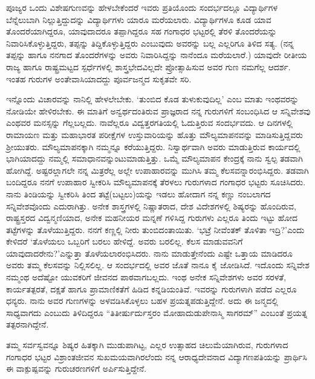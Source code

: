 {ಪೂಜ್ಯರ ಒಂದು ವಿಶೇಷಗುಣವನ್ನು ಹೇಳಬೇಕೆಂದರೆ ಇವರು ಪ್ರತಿಯೊಂದು ಸಂದರ್ಭ\-ದಲ್ಲೂ ವಿದ್ಯಾರ್ಥಿಗಳ ಬೆನ್ನೆಲುಬಾಗಿ ನಿಲ್ಲುತ್ತಿದ್ದುದನ್ನು ವಿದ್ಯಾರ್ಥಿಗಳು\-  ಯಾರೂ ಮರೆಯಲಾರು. ವಿದ್ಯಾರ್ಥಿಗಳೂ ಕೂಡ ಯಾವ ತೊಂದರೆಯಾಗಿದ್ದರೂ, ಯಾವುದಾದರೂ ತಪ್ಪಾಗಿದ್ದರೂ ಸಹ ಗಂಗಾಧರ ಭಟ್ಟರಲ್ಲಿ ತೆರಳಿ ತೊಂದರೆಯನ್ನು ನಿವಾರಿಸಿಕೊಳ್ಳುತ್ತಿದ್ದರು, ತಪ್ಪನ್ನು ತಿದ್ದಿಕೊಳ್ಳುತ್ತಿದ್ದರು ಎಂಬುವುದು ಅವರನ್ನು ಬಲ್ಲ ಎಲ್ಲರಿಗೂ ತಿಳಿದ ಸತ್ಯ. (ನನ್ನ ತಪ್ಪನ್ನು ಹಾಗೂ ನನಗಾದ ತೊಂದರೆಗಳನ್ನು ಅವರು ನಿವಾರಿಸಿದ್ದನ್ನು ನಾನೆಂದೂ ಮರೆಯ\-ಲಾರೆ.) ಯಾವುದೇ ರೀತೀಯ ರಾಜ್ಯ ಹಾಗೂ ರಾಷ್ಟ್ರಮಟ್ಟದ ಸ್ಪರ್ಧೆಗಳಲ್ಲಿ ಶಾಸ್ತ್ರಭೇದವಿಲ್ಲದೇ ಪ್ರೋತ್ಸಾಹಿಸುವ ಅವರ ಗುಣ ನಮಗೆಲ್ಲ ಆದರ್ಶ. ಇಂತಹ ಗುರುಗಳ ಅಂತೇವಾಸಿಯಾದದ್ದು ಪೂರ್ವಜನ್ಮದ ಸುಕೃತವೇ ಸರಿ.
\vskip 2pt

ಇನ್ನೊಂದು ವಿಚಾರವನ್ನು ನಾನಿಲ್ಲಿ ಹೇಳಲೇಬೇಕು. ‘ತುಂಬಿದ ಕೊಡ ತುಳುಕುವುದಿಲ್ಲ’ ಎಂಬ ಮಾತು ಇಂಥವರನ್ನು ನೋಡಿಯೇ ಹೇಳಿರಬೇಕು. ಈ ಮಾತಿಗೆ ಅನ್ವರ್ಥ\-ದಂತಿರುವ ಪ್ರಾಜ್ಞರಾದ ನನ್ನ ಗುರುಗಳಿಗೆ ಸಂಬಂಧಿಸಿದ ಆ ಸನ್ನಿವೇಶವು ಎಂಥವರ ಮನಸ್ಸನ್ನು ಗೆಲ್ಲಬಲ್ಲದು. ನಾವೆಲ್ಲರೂ ವಿದ್ವತ್ತರಗತಿಯಲ್ಲಿ ಓದುತ್ತಿರುವ ಸಂದರ್ಭವದು.  ಆ ದಿನಗಳಲ್ಲಿ  ರಾಮಾಯಣ ಮತ್ತು ಮಹಾಭಾರತ ಪರೀಕ್ಷೆಗಳ ಉಸ್ತುವಾರಿಯನ್ನು ಹೊತ್ತು ಮೌಲ್ಯಮಾಪನವನ್ನು ಮಾಡಿಸುತ್ತಿದ್ದವರು ಶ್ರೀಯುತರು. ಮೌಲ್ಯಮಾಪನಕ್ಕಾಗಿ ನಮ್ಮನ್ನೂ ಕರೆಯುತ್ತಿದ್ದರು. ನಿಸ್ವಾರ್ಥವಾಗಿ ಅವರು ಮಾಡುತ್ತಿರುವ ಕಾರ್ಯದಲ್ಲಿ ಭಾಗಿಯಾದದ್ದು ನಮ್ಮಲ್ಲಿ ಸಮಾಧಾನವನ್ನುಂಟುಮಾಡುತ್ತಿತ್ತು. ಒಮ್ಮೆ ಮೌಲ್ಯಮಾಪನ ಕೇಂದ್ರಕ್ಕೆ ನಾನು ಸ್ವಲ್ಪ ತಡವಾಗಿ ಹೋಗಿದ್ದೆ. ಅಷ್ಟರಲ್ಲಾಗಲೇ ನನ್ನ ಮಿತ್ರರೆಲ್ಲ ಅಲ್ಲೇ ಉಪಾಹಾರವನ್ನು ಮುಗಿಸಿ ತಮ್ಮ ಕೆಲಸವನ್ನಾರಂಭಿಸಿದ್ದರು. ತಡವಾಗಿ ಬಂದಿದ್ದರೂ ನನಗೆ ಉಪಾಹಾರ ಸ್ವೀಕರಿಸಿ ಮೌಲ್ಯಮಾಪನಕ್ಕೆ ತೆರಳಲು ಗುರುಗಳಾದ ಗಂಗಾಧರ ಭಟ್ಟರು ಸೂಚಿಸಿದರು. ನಾನು ತಿಂಡಿಯನ್ನು ಸ್ವೀಕರಿಸಿ ತಿಂದ ತಟ್ಟೆ(ಬಟ್ಟಲು)ಯನ್ನು ಇಡಲು ಹೋದಾಗ ನನ್ನ ಕಣ್ಣು ನಂಬಲಾಗದ ಸನ್ನಿವೇಶವೊಂದು ಎದುರಾಗಿತ್ತು. ಅನೇಕ ಶಾಸ್ತ್ರಗಳಲ್ಲಿ ನಿಷ್ಣಾತರಾದ, ದೇಶ ವಿದೇಶಗಳಲ್ಲಿ ಶಿಷ್ಯರನ್ನು ಹೊಂದಿರುವ, ರಾಷ್ಟ್ರಸ್ತರದ ವಿದ್ವನ್ಮಣಿಯಾದ, ಅನೇಕ ಮಹನೀಯರ ಮನ್ನಣೆ ಗಳಿಸಿದ್ದ ಗುರುಗಳು ಎಲ್ಲರೂ ತಿಂದು ಇಟ್ಟು ಹೋದ ತಟ್ಟೆಗಳನ್ನು ತೊಳೆಯುತ್ತಿದ್ದರು. ನನಗೆ ಕಣ್ಣಲ್ಲಿ ನೀರು ತುಂಬಿದಂತಾಯಿತು. ‘ಭಟ್ರೆ ನೀವೆಂತಕ್ ತೊಳಿತಾ ಇದ್ರಿ?’ಎಂದು ಕೇಳಿದರೆ ‘ತೊಳೆಯಲು ಒಬ್ಬರಿಗೆ ಬರಲು ಹೇಳಿದ್ದೆ. ಅವರು ಬರಲಿಲ್ಲ. ಕೆಲಸ ಮಾಡುವವನಿಗೆ ಯಾವುದಾದ\-ರೇನು?’ಎನ್ನುತ್ತಾ ತೊಳೆಯಲಾರಂಭಿಸಿದರು. ನಾನು ಮಾಡುತ್ತೇನೆಂದು ಎಷ್ಟೇ ಒತ್ತಾಯ ಮಾಡಿದರೂ ಅವರು ತಮ್ಮ ಕೆಲಸವನ್ನು ನಿಲ್ಲಿಸಲಿಲ್ಲ. ಆ ಸಂದರ್ಭದಲ್ಲಿ ಅವರ ಜೊತೆ ನಾನೂ ಕೈ ಜೋಡಿಸಿದೆ. ಇದೊಂದು ಸನ್ನಿವೇಶ ನಮ್ಮಂಥ ಅದೆಷ್ಟೋ ಯುವಕರಿಗೆ ಜೀವನದ ಪಾಠವಾಗಬಲ್ಲದು. ಇಂಥ ಅನೇಕ ಸನ್ನಿವೇಶಗಳು ಅವರ ಸರಳತೆ, ಕಾರ್ಯತತ್ಪರತೆ, ದಕ್ಷತೆ ಹಾಗೂ ಪ್ರಾಮಾಣಿಕತೆಗೆ ಹಿಡಿದ ಕನ್ನಡಿಯಂತಿವೆ. ಇವರನ್ನು ಗುರುಗಳಾಗಿ ಪಡೆದ ಎಲ್ಲರೂ ಧನ್ಯರು. ನಾನು ಅವರ ಗುಣಗಳನ್ನು ಅಳವಡಿಸಿಕೊಳ್ಳಲು ಬಹಳ ಪ್ರಯತ್ನಪಡುತ್ತಿದ್ದೇನೆ. ಅದು ಈ ಜನ್ಮದಲ್ಲಿ ಸಾಧ್ಯವಾಗದು ಎಂಬುದು ತಿಳಿದಿದ್ದರೂ “ತಿತೀರ್ಷುರ್ದುಸ್ತರಂ ಮೋಹಾದುಡುಪೇನಾಸ್ಮಿ ಸಾಗರಮ್” ಎಂಬಂತೆ ಪ್ರಯತ್ನ ತತ್ಪರನಾಗಿದ್ದೇನೆ. 
\vskip 2pt

ತಮ್ಮ ಸರ್ವಸ್ವವನ್ನೂ ಶಿಷ್ಯರ ಹಿತಕ್ಕಾಗಿ ಮುಡುಪಾಗಿಟ್ಟ, ಎಲ್ಲರ ಉತ್ಸಾಹದ ಚಿಲುಮೆ\-ಯಾಗಿರುವ,  ಗುರುಗಳಾದ ಗಂಗಾಧರ ಭಟ್ಟರ ವಿಶ್ರಾಂತಜೀವನ ಸುಖಮಯವಾಗಿರಲೆಂದು ನನ್ನ ಆರಾಧ್ಯದೇವನಾದ ವಿದ್ಯಾಗಣಪತಿಯನ್ನು ಪ್ರಾರ್ಥಿಸಿ ಈ ವಾಕ್ಪುಷ್ಪ\-ವನ್ನು ಗುರುಚರಣಗಳಿಗೆ ಅರ್ಪಿಸುತ್ತಿದ್ದೇನೆ.

\articleend
}
